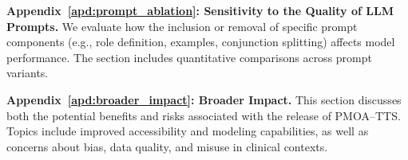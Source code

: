 \documentclass{article}
\begin{document}
\textbf{Appendix~\ref{apd:prompt_ablation}: Sensitivity to the Quality of LLM Prompts.} We evaluate how the inclusion or removal of specific prompt components (e.g., role definition, examples, conjunction splitting) affects model performance. The section includes quantitative comparisons across prompt variants.

\textbf{Appendix~\ref{apd:broader_impact}: Broader Impact.} This section discusses both the potential benefits and risks associated with the release of PMOA–TTS. Topics include improved accessibility and modeling capabilities, as well as concerns about bias, data quality, and misuse in clinical contexts.







\clearpage
\end{document}
